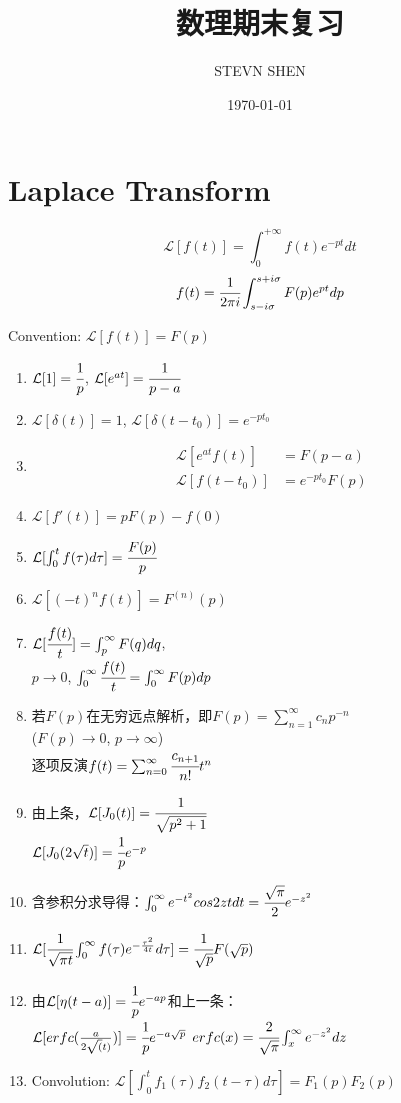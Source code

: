\documentclass[a4paper, 11pt]{article}
\title{数理期末复习}
\author{STEVN SHEN}
\date{\today}
\newcommand{\lap}[1]{\mathcal{L}[{#1}]}
\begin{document}
\maketitle

\section{Laplace Transform}
\begin{equation*}
\lap{f(t)} = \int_0 ^{+ \infty} f(t) e^{-pt} dt
\end{equation*}
\begin{equation*}
f(t)= \cfrac{1}{2\pi i}\int_{s - i\sigma} ^{s + i\sigma} F(p) e^{pt} dp
\end{equation*}

Convention: $\lap{f(t)} = F(p)$
\begin{enumerate}
\item $\lap{1} = \cfrac{1}{p}$, $\lap{e^{at}} = \cfrac{1}{p - a}$
\item $\lap{\delta(t)} = 1$, $\lap{\delta(t - t_0)} = e^{-pt_0}$
\item 
\begin{subequations}
\begin{align*}
\lap{e^{at}f(t)} &= F(p - a) \\
\lap{f(t - t_0)} &= e^{-pt_0}F(p)
\end{align*}
\end{subequations}
\item $\lap{f'(t)} = pF(p) - f(0)$
\item $\lap{\int_0^{t} f(\tau) d\tau} = \cfrac{F(p)}{p}$
\item $\lap{(-t)^n f(t)} = F^{(n)}(p)$
\item $\lap{\cfrac{f(t)}{t}} = \int_{p}^{\infty} F(q)dq$, \\
$p \rightarrow 0$, $\int_0^{\infty} \cfrac{f(t)}{t} = \int_0^{\infty} F(p)dp$
\item 若$F(p)$在无穷远点解析，即$F(p) = \sum_{n=1}^{\infty}c_n p^{-n}$\\
($F(p) \rightarrow 0$, $p \rightarrow \infty$) \\
逐项反演$f(t) = \sum_{n=0}^{\infty}\cfrac{c_{n+1}}{n!}t^n$
\item 由上条，$\lap{J_0(t)} = \cfrac{1}{\sqrt{p^2 + 1}}$\\
$\lap{J_0(2\sqrt{t})} = \cfrac{1}{p}e^{-p}$
\item 含参积分求导得：$\int_0^{\infty}e^{-t^2}cos2zt dt = \cfrac{\sqrt{\pi}}{2}e^{-z^2}$
\item $\lap{\cfrac{1}{\sqrt{\pi t}}\int_0^{\infty} f(\tau) e^{- \frac{\tau^2}{4t}} d\tau} = \cfrac{1}{\sqrt{p}}F(\sqrt{p})$
\item 由$\lap{\eta(t-a)} = \cfrac{1}{p}e^{-ap}$和上一条：\\
$\lap{erfc(\frac{a}{2\sqrt(t)})} = \cfrac{1}{p}e^{-a\sqrt{p}}$ \quad $erfc(x) = \cfrac{2}{\sqrt{\pi}} \int_x^{\infty} e^{-z^2} dz$
\item Convolution: $\lap{\int_0^t f_1(\tau) f_2(t-\tau) d\tau} = F_1(p)F_2(p)$
\end{enumerate}
\end{document}
